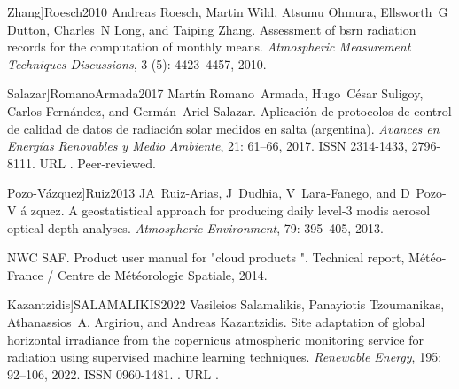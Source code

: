 \documentclass[letterpaper,12pt, twoside]{report}
\providecommand{\DIFdeltex}[1]{{\protect\color{red} \scriptsize #1}} %
\providecommand{\DIFdel}[1]{\texorpdfstring{\DIFdeltex{#1}}{}} %
\begin{document}
  Zhang]{Roesch2010}
\DIFdel{Andreas Roesch, Martin Wild, Atsumu Ohmura, Ellsworth~G Dutton, Charles~N Long,
  and Taiping Zhang.
}%
\DIFdel{Assessment of bsrn radiation records for the computation of monthly
  means.
}%
\DIFdel{\emph{Atmospheric Measurement Techniques Discussions}, 3}%
\DIFdel{(5):}%
\DIFdel{4423--4457, 2010.
}%

  Salazar]{RomanoArmada2017}
\DIFdel{Martín Romano~Armada, Hugo~César Suligoy, Carlos Fernández, and
  Germán~Ariel Salazar.
}%
\DIFdel{Aplicación de protocolos de control de calidad de datos de
  radiación solar medidos en salta (argentina).
}%
\DIFdel{\emph{Avances en Energías Renovables y Medio Ambiente}, 21:}%
\DIFdel{61--66, 2017.
}%
\DIFdel{ISSN 2314-1433, 2796-8111.
}%
\DIFdel{URL
  }%
\DIFdel{.
}%
\DIFdel{Peer-reviewed.
}%

  Pozo-V{\'a}zquez]{Ruiz2013}
\DIFdel{JA~Ruiz-Arias, J~Dudhia, V~Lara-Fanego, and D~Pozo-V}%
\DIFdel{\'a}%
\DIFdel{zquez.
}%
\DIFdel{A geostatistical approach for producing daily level-3 modis aerosol
  optical depth analyses.
}%
\DIFdel{\emph{Atmospheric Environment}, 79:}%
\DIFdel{395--405, 2013.
}%

\DIFdel{NWC SAF.
}%
\DIFdel{Product user manual for "cloud products ".
}%
\DIFdel{Technical report, Météo-France / Centre de Météorologie Spatiale,
  2014.
}%

  Kazantzidis]{SALAMALIKIS2022}
\DIFdel{Vasileios Salamalikis, Panayiotis Tzoumanikas, Athanassios~A. Argiriou, and
  Andreas Kazantzidis.
}%
\DIFdel{Site adaptation of global horizontal irradiance from the copernicus
  atmospheric monitoring service for radiation using supervised machine
  learning techniques.
}%
\DIFdel{\emph{Renewable Energy}, 195:}%
\DIFdel{92--106, 2022.
}%
\DIFdel{ISSN 0960-1481.
}%
\DIFdel{.
}%
\DIFdel{URL
  }%
\DIFdel{.
}%
\end{document}
